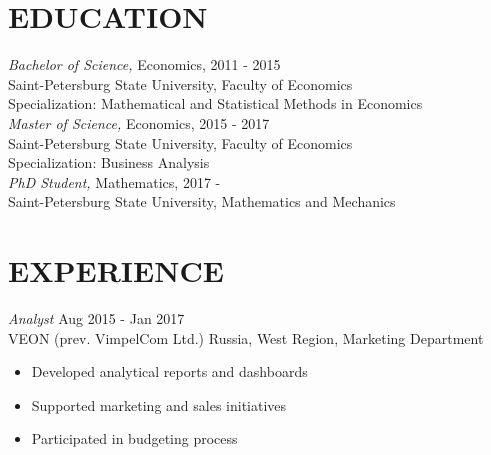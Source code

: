 \documentclass[margin, 11pt]{res} %
\begin{document}
\begin{resume}

 



\section{EDUCATION}

{\sl Bachelor of Science,} Economics, \hfill 2011 - 2015 \\
Saint-Petersburg State University, Faculty of Economics\\
Specialization: Mathematical and Statistical Methods in Economics \\

{\sl Master of Science,} Economics, \hfill 2015 - 2017  \\
Saint-Petersburg State University, Faculty of Economics\\
Specialization: Business Analysis \\

{\sl PhD Student,} Mathematics, \hfill 2017 -  \\
Saint-Petersburg State University, Mathematics and Mechanics \\
 
\section{EXPERIENCE}

{\sl Analyst} \hfill Aug 2015 - Jan 2017 \\
VEON (prev. VimpelCom Ltd.) Russia, West Region, Marketing Department
\begin{itemize} \itemsep -2pt %
\item Developed analytical reports and dashboards
\item Supported marketing and sales initiatives
\item Participated in budgeting process
\end{itemize}
 

\end{resume}
\end{document}

